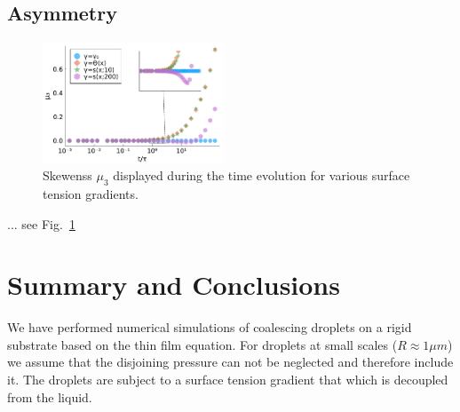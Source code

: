 \documentclass[twocolumn,amsmath,amssymb,showpacs,pre,nofootinbib,superscriptaddress]{revtex4-1} %
\begin{document}
\subsection{Asymmetry}\label{subsec:skewness}
\begin{figure}
    \centering
    \includegraphics[width=0.48\textwidth]{Figures/skew_evo.pdf}
    \caption{Skewenss $\mu_3$ displayed during the time evolution for various surface tension gradients.}
    \label{fig:skewness}
\end{figure}

... see Fig.~\ref{fig:skewness}

\section{Summary and Conclusions}\label{sec:sum_conclu}
We have performed numerical simulations of coalescing droplets on a rigid substrate based on the thin film equation.
For droplets at small scales ($R \approx 1\mu m$) we assume that the disjoining pressure can not be neglected and therefore include it. 
The droplets are subject to a surface tension gradient that which is decoupled from the liquid.


\begin{acknowledgements}

\end{acknowledgements}

    
\end{document}
